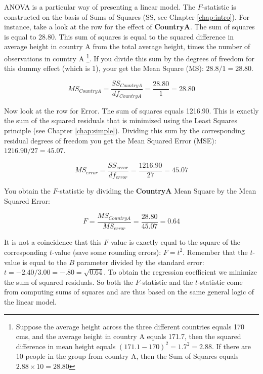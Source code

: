 \documentclass[]{report}\usepackage[]{graphicx}\usepackage[]{color}
\begin{document}
ANOVA is a particular way of presenting a linear model. The $F$-statistic is constructed on the basis of Sums of Squares (SS, see Chapter \ref{chap:intro}). For instance, take a look at the row for the effect of \textbf{CountryA}. The sum of squares is equal to 28.80. This sum of squares is equal to the squared difference in average height in country A from the total average height, times the number of observations in country A \footnote{Suppose the average height across the three different countries equals 170 cms, and the average height in country A equals 171.7, then the squared difference in mean height equals $(171.1-170)^2=1.7^2=2.88$. If there are 10 people in the group from country A, then the Sum of Squares equals $2.88\times 10=28.80$}. If you divide this sum by the degrees of freedom for this dummy effect (which is 1), your get the Mean Square (MS): $28.8/1=28.80$. 

\begin{equation}
MS_{CountryA}=\frac{SS_{CountryA}}{df_{CountryA}}=\frac{28.80}{1}=28.80 \label{eq:MSgroup}
\end{equation}

Now look at the row for Error. The sum of squares equals 1216.90. This is exactly the sum of the squared residuals that is minimized using the Least Squares principle (see Chapter \ref{chap:simple}). Dividing this sum by the corresponding residual degrees of freedom you get the Mean Squared Error (MSE): $1216.90/27=45.07$. 

\begin{equation}
MS_{error}=\frac{SS_{error}}{df_{error}}=\frac{1216.90}{27}=45.07  \label{eq:MSerror}
\end{equation}


You obtain the $F$-statistic by dividing the \textbf{CountryA} Mean Square by the Mean Squared Error: 


\begin{equation}
F=\frac{MS_{CountryA}}{MS_{error}}=\frac{28.80}{45.07}=0.64 \label{eq:F}
\end{equation}

It is not a coincidence that this $F$-value is exactly equal to the square of the corresponding $t$-value (save some rounding errors): $F=t^2$. Remember that the $t$-value is equal to the $B$ parameter divided by the standard error: $t=-2.40/3.00=-.80=\sqrt{0.64}$. To obtain the regression coefficient we minimize the sum of squared residuals. So both the $F$-statistic and the $t$-statistic come from computing sums of squares and are thus based on the same general logic of the linear model.\\
\end{document}
